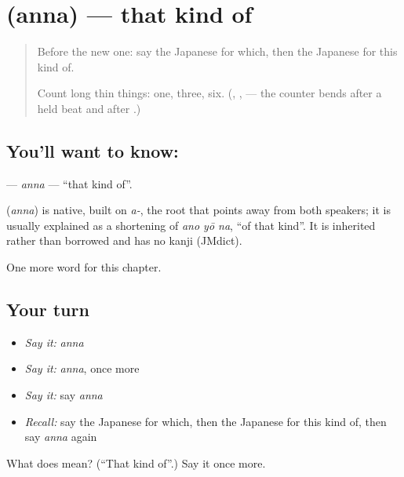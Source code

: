 \section[\texorpdfstring{\ja{あんな} (anna)}{あんな (anna)}]{ (anna) — that kind of}

\label{lesson:JA-C83-anna}



\begin{quote}
Before the new one: say the Japanese for which, then the Japanese for this kind of.

Count long thin things: one, three, six. (\textbf{}, \textbf{}, \textbf{} — the counter bends after a held beat and after \textbf{}.)
\end{quote}

\subsection*{You'll want to know: }
\textbf{} — \emph{anna} — \textquotedblleft{}that kind of\textquotedblright{}.

\begin{cousinweb}
\textbf{} (\emph{anna}) is native, built on \emph{a-}, the root that points away from both speakers; it is usually explained as a shortening of \emph{ano yō na}, \textquotedblleft{}of that kind\textquotedblright{}. It is inherited rather than borrowed and has no kanji (JMdict).
\end{cousinweb}

\begin{grammarlens}[title={What you've built}]
One more word for this chapter.
\end{grammarlens}

\subsection*{Your turn}
\begin{itemize}
\raggedright
  \item \emph{Say it:} \emph{anna}
  \item \emph{Say it:} \emph{anna}, once more
  \item \emph{Say it:} say \emph{anna}
  \item \emph{Recall:} say the Japanese for which, then the Japanese for this kind of, then say \emph{anna} again
\end{itemize}

\begin{tcolorbox}[breakable,colback=teal!4,colframe=teal!35!black,title={Before you move on}]
What does  mean? (\textquotedblleft{}That kind of\textquotedblright{}.) Say it once more.
\end{tcolorbox}
